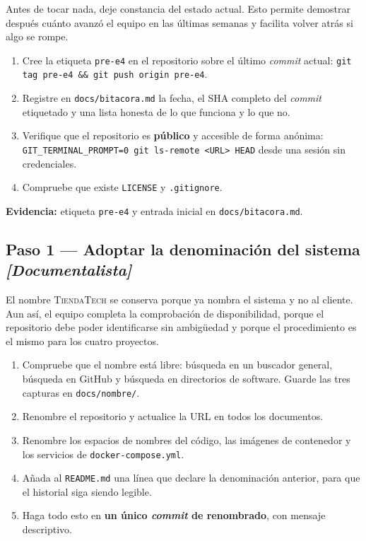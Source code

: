 \documentclass[11pt,a4paper]{article}
\newcommand{\paso}[1]{\subsection{#1}}
\begin{document}
	Antes de tocar nada, deje constancia del estado actual. Esto permite demostrar después cuánto avanzó el equipo en las últimas semanas y facilita volver atrás si algo se rompe.
	
	\begin{enumerate}[leftmargin=*,itemsep=3pt]
		\item Cree la etiqueta \texttt{pre-e4} en el repositorio sobre el último \emph{commit} actual: \texttt{git tag pre-e4 \&\& git push origin pre-e4}.
		\item Registre en \texttt{docs/bitacora.md} la fecha, el SHA completo del \emph{commit} etiquetado y una lista honesta de lo que funciona y lo que no.
		\item Verifique que el repositorio es \textbf{público} y accesible de forma anónima: \texttt{GIT\_TERMINAL\_PROMPT=0 git ls-remote <URL> HEAD} desde una sesión sin credenciales.
		\item Compruebe que existe \texttt{LICENSE} y \texttt{.gitignore}.
	\end{enumerate}
	
	\textbf{Evidencia:} etiqueta \texttt{pre-e4} y entrada inicial en \texttt{docs/bitacora.md}.
	
	\paso{Paso 1 --- Adoptar la denominación del sistema \emph{[Documentalista]}}
	
	El nombre \textsc{TiendaTech} se conserva porque ya nombra el sistema y no al cliente. Aun así, el equipo completa la comprobación de disponibilidad, porque el repositorio debe poder identificarse sin ambigüedad y porque el procedimiento es el mismo para los cuatro proyectos.
	
	\begin{enumerate}[leftmargin=*,itemsep=3pt]
		\item Compruebe que el nombre está libre: búsqueda en un buscador general, búsqueda en GitHub y búsqueda en directorios de software. Guarde las tres capturas en \texttt{docs/nombre/}.
		\item Renombre el repositorio y actualice la URL en todos los documentos.
		\item Renombre los espacios de nombres del código, las imágenes de contenedor y los servicios de \texttt{docker-compose.yml}.
		\item Añada al \texttt{README.md} una línea que declare la denominación anterior, para que el historial siga siendo legible.
		\item Haga todo esto en \textbf{un único \emph{commit} de renombrado}, con mensaje descriptivo.
	\end{enumerate}
	
\end{document}
